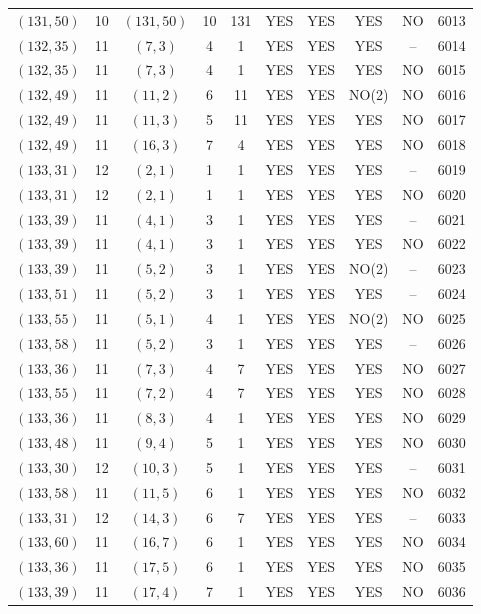\begin{longtable}{|c|c|c|c|c|c|c|c|c|c|}
$(131, 50)$ & 10 & $(131, 50)$ & 10 & 131 & YES & YES & YES & NO & 6013\\
$(132, 35)$ & 11 & $(7, 3)$ & 4 & 1 & YES & YES & YES & -- & 6014\\
$(132, 35)$ & 11 & $(7, 3)$ & 4 & 1 & YES & YES & YES & NO & 6015\\
$(132, 49)$ & 11 & $(11, 2)$ & 6 & 11 & YES & YES & NO(2) & NO & 6016\\
$(132, 49)$ & 11 & $(11, 3)$ & 5 & 11 & YES & YES & YES & NO & 6017\\
$(132, 49)$ & 11 & $(16, 3)$ & 7 & 4 & YES & YES & YES & NO & 6018\\
$(133, 31)$ & 12 & $(2, 1)$ & 1 & 1 & YES & YES & YES & -- & 6019\\
$(133, 31)$ & 12 & $(2, 1)$ & 1 & 1 & YES & YES & YES & NO & 6020\\
$(133, 39)$ & 11 & $(4, 1)$ & 3 & 1 & YES & YES & YES & -- & 6021\\
$(133, 39)$ & 11 & $(4, 1)$ & 3 & 1 & YES & YES & YES & NO & 6022\\
$(133, 39)$ & 11 & $(5, 2)$ & 3 & 1 & YES & YES & NO(2) & -- & 6023\\
$(133, 51)$ & 11 & $(5, 2)$ & 3 & 1 & YES & YES & YES & -- & 6024\\
$(133, 55)$ & 11 & $(5, 1)$ & 4 & 1 & YES & YES & NO(2) & NO & 6025\\
$(133, 58)$ & 11 & $(5, 2)$ & 3 & 1 & YES & YES & YES & -- & 6026\\
$(133, 36)$ & 11 & $(7, 3)$ & 4 & 7 & YES & YES & YES & NO & 6027\\
$(133, 55)$ & 11 & $(7, 2)$ & 4 & 7 & YES & YES & YES & NO & 6028\\
$(133, 36)$ & 11 & $(8, 3)$ & 4 & 1 & YES & YES & YES & NO & 6029\\
$(133, 48)$ & 11 & $(9, 4)$ & 5 & 1 & YES & YES & YES & NO & 6030\\
$(133, 30)$ & 12 & $(10, 3)$ & 5 & 1 & YES & YES & YES & -- & 6031\\
$(133, 58)$ & 11 & $(11, 5)$ & 6 & 1 & YES & YES & YES & NO & 6032\\
$(133, 31)$ & 12 & $(14, 3)$ & 6 & 7 & YES & YES & YES & -- & 6033\\
$(133, 60)$ & 11 & $(16, 7)$ & 6 & 1 & YES & YES & YES & NO & 6034\\
$(133, 36)$ & 11 & $(17, 5)$ & 6 & 1 & YES & YES & YES & NO & 6035\\
$(133, 39)$ & 11 & $(17, 4)$ & 7 & 1 & YES & YES & YES & NO & 6036\\

\end{longtable}
